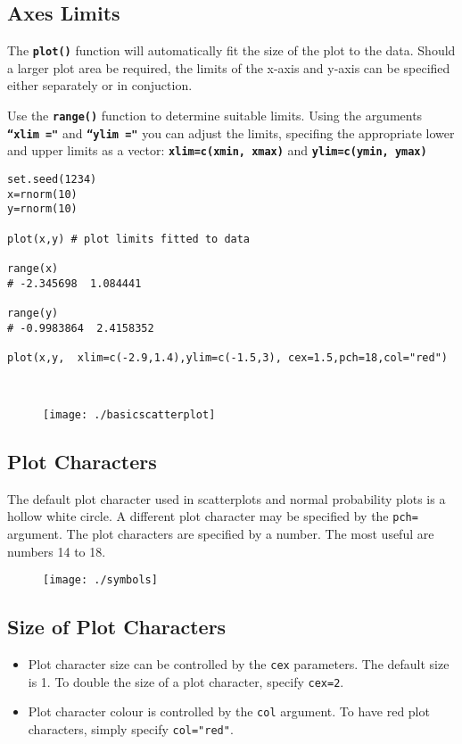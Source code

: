 \subsection{Axes Limits}
The \textbf{\texttt{plot()}} function will automatically fit the size of the plot to the data. Should a larger plot area be required, the limits of the x-axis and y-axis can be specified either separately or in conjuction. 


\noindent Use the \textbf{\texttt{range()}} function to determine suitable limits. Using the arguments \textbf{\texttt{``xlim ="}} and \textbf{\texttt{``ylim ="}} you can adjust the limits, specifing the appropriate lower and upper limits as a vector: \textbf{\texttt{xlim=c(xmin, xmax)}} and \textbf{\texttt{ylim=c(ymin, ymax)}}

\begin{framed}
\begin{verbatim}
set.seed(1234)
x=rnorm(10)
y=rnorm(10)

plot(x,y) # plot limits fitted to data

range(x)
# -2.345698  1.084441

range(y)
# -0.9983864  2.4158352

plot(x,y,  xlim=c(-2.9,1.4),ylim=c(-1.5,3), cex=1.5,pch=18,col="red")



\end{verbatim}
\end{framed}
\begin{figure}[h!]
\centering
\texttt{[image: ./basicscatterplot]}

\end{figure}



\subsection{Plot Characters}
The default plot character used in scatterplots and normal probability plots is a hollow white circle.
A different plot character may be specified by the \texttt{pch=} argument. The plot characters are specified by a number. The most useful are numbers 14 to 18.

\begin{figure}
\centering
\texttt{[image: ./symbols]}
\caption{}
\label{fig:symbols}
\end{figure}
\subsection{Size of Plot Characters}
\begin{itemize}
\item Plot character size can be controlled by the \texttt{cex} parameters. The default size is 1. To double the size of a plot character, specify \texttt{cex=2}.

\item Plot character colour is controlled by the \texttt{col} argument. To have red plot characters, simply specify \texttt{col="red"}.
\end{itemize}

